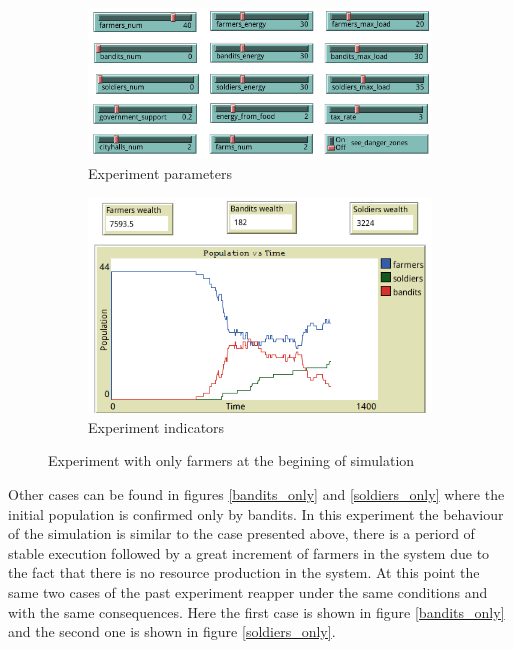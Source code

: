 \documentclass{wscpaperproc}
\begin{document}
\begin{figure}[h!]
    \begin{subfigure}{0.45\textwidth}
    \includegraphics[width=\textwidth]{Images/Exp2_sliders.png}
    \caption{Experiment parameters}
    \end{subfigure}
    \hfill
    \begin{subfigure}{0.45\textwidth}
    \includegraphics[width=\textwidth]{Images/Exp2_indicators.png}
    \caption{Experiment indicators}
    \end{subfigure}%
    \caption{Experiment with only farmers at the begining of simulation}
    \label{only_farmers}
\end{figure}

Other cases can be found in figures \ref{bandits_only} and \ref{soldiers_only}
where the initial population is confirmed only by bandits. In this experiment
the behaviour of the simulation is similar to the case presented above, there
is a periord of stable execution followed by a great increment of farmers in
the system due to the fact that there is no resource production in the system.
At this point the same two cases of the past experiment reapper under the same
conditions and with the same consequences. Here the first case is shown in
figure \ref{bandits_only} and the second one is shown in figure
\ref{soldiers_only}.\\
\end{document}
